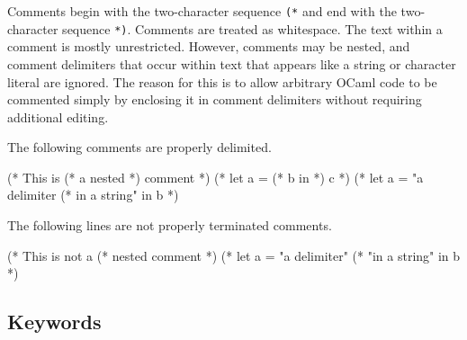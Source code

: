 Comments begin with the two-character sequence \verb/(*/ and end with the two-character
sequence \verb/*)/.  Comments are treated as whitespace.  The text within a comment is mostly
unrestricted.  However, comments may be nested, and comment delimiters that occur within text that
appears like a string or character literal are ignored.  The reason for this is to allow arbitrary
OCaml code to be commented simply by enclosing it in comment delimiters without requiring additional editing.

The following comments are properly delimited.

\begin{ocaml}
(* This is (* a nested *) comment *)
(* let a = (* b in *) c *)
(* let a = "a delimiter (* in a string" in b *)
\end{ocaml}
%
The following lines are not properly terminated comments.

\begin{ocaml}
(* This is not a (* nested comment *)
(* let a = "a delimiter" (* "in a string" in b *)
\end{ocaml}

\subsection{Keywords}

